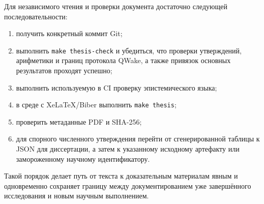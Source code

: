 Для независимого чтения и проверки документа достаточно следующей
последовательности:
\begin{enumerate}
  \item получить конкретный коммит Git;
  \item выполнить \texttt{make thesis-check} и убедиться, что проверки
    утверждений, арифметики и границ протокола QWake, а также привязок основных
    результатов проходят успешно;
  \item выполнить используемую в CI проверку эпистемического языка;
  \item в среде с XeLaTeX/Biber выполнить \texttt{make thesis};
  \item проверить метаданные PDF и SHA-256;
  \item для спорного численного утверждения перейти от сгенерированной таблицы
    к JSON для диссертации, а затем к указанному исходному артефакту или
    замороженному научному идентификатору.
\end{enumerate}

Такой порядок делает путь от текста к доказательным материалам явным и
одновременно сохраняет границу между документированием уже завершённого
исследования и новым научным выполнением.
